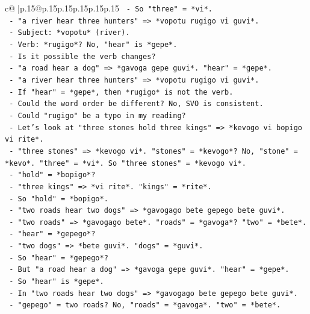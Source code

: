 \documentclass{article}
\begin{document}
{\begin{supertabular}{c@{$\;$}|p{.15\linewidth}@{}p{.15\linewidth}p{.15\linewidth}p{.15\linewidth}p{.15\linewidth}p{.15\linewidth}}
{{{\texttt{        {-} So "three" = *vi*.} \\
\texttt{      {-} "a river hear three hunters" => *vopotu rugigo vi guvi*.} \\
\texttt{        {-} Subject: *vopotu* (river).} \\
\texttt{        {-} Verb: *rugigo*? No, "hear" is *gepe*.} \\
\texttt{        {-} Is it possible the verb changes?} \\
\texttt{        {-} "a road hear a dog" => *gavoga gepe guvi*. "hear" = *gepe*.} \\
\texttt{        {-} "a river hear three hunters" => *vopotu rugigo vi guvi*.} \\
\texttt{        {-} If "hear" = *gepe*, then *rugigo* is not the verb.} \\
\texttt{        {-} Could the word order be different? No, SVO is consistent.} \\
\texttt{        {-} Could "rugigo" be a typo in my reading?} \\
\texttt{        {-} Let's look at "three stones hold three kings" => *kevogo vi bopigo vi rite*.} \\
\texttt{          {-} "three stones" => *kevogo vi*. "stones" = *kevogo*? No, "stone" = *kevo*. "three" = *vi*. So "three stones" = *kevogo vi*.} \\
\texttt{          {-} "hold" = *bopigo*?} \\
\texttt{          {-} "three kings" => *vi rite*. "kings" = *rite*.} \\
\texttt{          {-} So "hold" = *bopigo*.} \\
\texttt{        {-} "two roads hear two dogs" => *gavogago bete gepego bete guvi*.} \\
\texttt{          {-} "two roads" => *gavogago bete*. "roads" = *gavoga*? "two" = *bete*.} \\
\texttt{          {-} "hear" = *gepego*?} \\
\texttt{          {-} "two dogs" => *bete guvi*. "dogs" = *guvi*.} \\
\texttt{          {-} So "hear" = *gepego*?} \\
\texttt{          {-} But "a road hear a dog" => *gavoga gepe guvi*. "hear" = *gepe*.} \\
\texttt{          {-} So "hear" is *gepe*.} \\
\texttt{          {-} In "two roads hear two dogs" => *gavogago bete gepego bete guvi*.} \\
\texttt{          {-} "gepego" = two roads? No, "roads" = *gavoga*. "two" = *bete*.} \\
}}}
\end{supertabular}}
\end{document}
